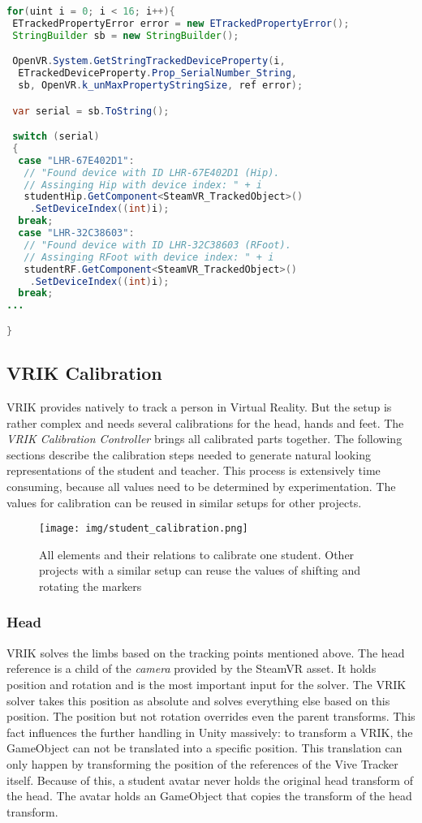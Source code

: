 \begin{lstlisting}[language=JAVA, frame=single]
for(uint i = 0; i < 16; i++){
 ETrackedPropertyError error = new ETrackedPropertyError();
 StringBuilder sb = new StringBuilder();

 OpenVR.System.GetStringTrackedDeviceProperty(i,
  ETrackedDeviceProperty.Prop_SerialNumber_String, 
  sb, OpenVR.k_unMaxPropertyStringSize, ref error);

 var serial = sb.ToString();

 switch (serial)
 {
  case "LHR-67E402D1":
   // "Found device with ID LHR-67E402D1 (Hip).
   // Assinging Hip with device index: " + i
   studentHip.GetComponent<SteamVR_TrackedObject>()
    .SetDeviceIndex((int)i);
  break;
  case "LHR-32C38603":
   // "Found device with ID LHR-32C38603 (RFoot).
   // Assinging RFoot with device index: " + i
   studentRF.GetComponent<SteamVR_TrackedObject>()
    .SetDeviceIndex((int)i);
  break;
...

}
\end{lstlisting}

\subsection{VRIK Calibration}
VRIK provides natively to track a person in Virtual Reality. But the setup is rather complex and needs several calibrations for the head, hands and feet. The \textit{VRIK Calibration Controller} brings all calibrated parts together. The following sections describe the calibration steps needed to generate natural looking representations of the student and teacher. This process is extensively time consuming, because all values need to be determined by experimentation. The values for calibration can be reused in similar setups for other projects.
\begin{figure}
	\centering
	\texttt{[image: img/student\_calibration.png]}
	\caption{All elements and their relations to calibrate one student. Other projects with a similar setup can reuse the values of shifting and rotating the markers}
	\label{fig:student_calibration}
\end{figure}
\subsubsection{Head}
VRIK solves the limbs based on the tracking points mentioned above. The head reference is a child of the \textit{camera} provided by the SteamVR asset. It holds position and rotation and is the most important input for the solver. The VRIK solver takes this position as absolute and solves everything else based on this position. The position but not rotation overrides even the parent transforms. This fact influences the further handling in Unity massively: to transform a VRIK, the GameObject can not be translated into a specific position. This translation can only happen by transforming the position of the references of the Vive Tracker itself. Because of this, a student avatar never holds the original head transform of the head. The avatar holds an GameObject that copies the transform of the head transform.
